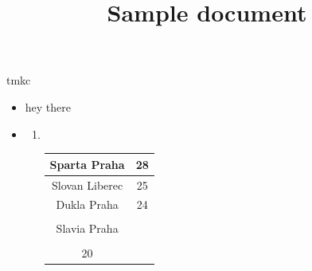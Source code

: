 \documentclass{article}
\title{Sample document}
\begin{document}
\maketitle
\begin{center}
tmkc\begin{itemize}
\item \hspace{1pt}hey there 
\item \hspace{1pt}\begin{enumerate}
\item \hspace{1pt} \\ 
 
 \begin{table}[!ht]

 \begin{tabular}
{ |c|c| }
\hline   Sparta Praha & 28\\ 
\hline Slovan Liberec & 25\\ 
\hline Dukla Praha & 24\\ 
\hline  \\ 
 Slavia Praha  \\ 
  &  \\ 
 20\\ 
\hline 
 \end{tabular}
\end{table}

\end{enumerate}

\end{itemize}
\end{center}
\end{document}
